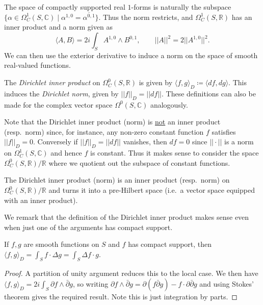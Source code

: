 The space of compactly supported real \(1\)-forms is naturally the subspace
\(\{\alpha\in
\Omega^1_C(S,\mathbb{C})\;|\;\alpha^{1,0}=\overline{\alpha^{0,1}}\}\). Thus the
norm restricts, and \(\Omega^1_C(S,\mathbb{R})\) has an inner product and a norm given as
\[\langle A,B \rangle = 2i \int_S A^{1,0}\wedge B^{0,1}, \qquad ||A||^2 =
2||A^{1,0}||^2.\]
We can then use the exterior derivative to induce a norm on the space of
smooth real-valued functions.

\begin{definition}
    The \textit{Dirichlet inner product} on \(\Omega^0_C(S,\mathbb{R})\) is
    given by \(\langle f,g \rangle_D \coloneq \langle df,dg\rangle\). This
    induces the \textit{Dirichlet norm}, given by \(||f||_D = ||df||\). These
    definitions can also be made for the complex vector space
    \(\Omega^0(S,\mathbb{C})\) analogously.
\end{definition}

Note that the Dirichlet inner product (norm) is \underline{not} an inner product
(resp.\ norm) since, for instance, any non-zero constant function \(f\)
satisfies \(||f||_D=0\). Conversely if \(||f||_D=||df||\) vanishes, then
\(df=0\) since \(||\cdot ||\) is a norm on \(\Omega^1_C(S,\mathbb{C})\) and
hence \(f\) is constant. Thus it makes sense to consider the space
\(\Omega^0_C(S,\mathbb{R})/\mathbb{R}\) where we quotient out the subspace of
constant functions.

\begin{proposition}
    The Dirichlet inner product (norm) is an inner product (resp.\ norm) on
    \(\Omega^0_C(S,\mathbb{R})/\mathbb{R}\) and turns it into a pre-Hilbert
    space (i.e.\ a vector space equipped with an inner product).
\end{proposition}

We remark that the definition of the Dirichlet inner product makes sense even when just one of the arguments has compact support.

\begin{lemma}
    If \(f,g\) are smooth functions on \(S\) and \(f\) has compact support,
    then \(\langle f,g \rangle_D = \int_S f\cdot \Delta g = \int_S
    \Delta f \cdot g.\)

    \begin{proof}
        A partition of unity argument reduces this to the local case. We then
        have \(\langle f,g\rangle_D = 2i \int_S \partial f\wedge \bar\partial g
        \), so writing \(\partial f \wedge \bar\partial g = \partial
        (f\bar\partial g)-f\cdot\partial\bar\partial g \) and using Stokes'
        theorem gives the required result. Note this is just integration by
        parts.
    \end{proof}
\end{lemma}

